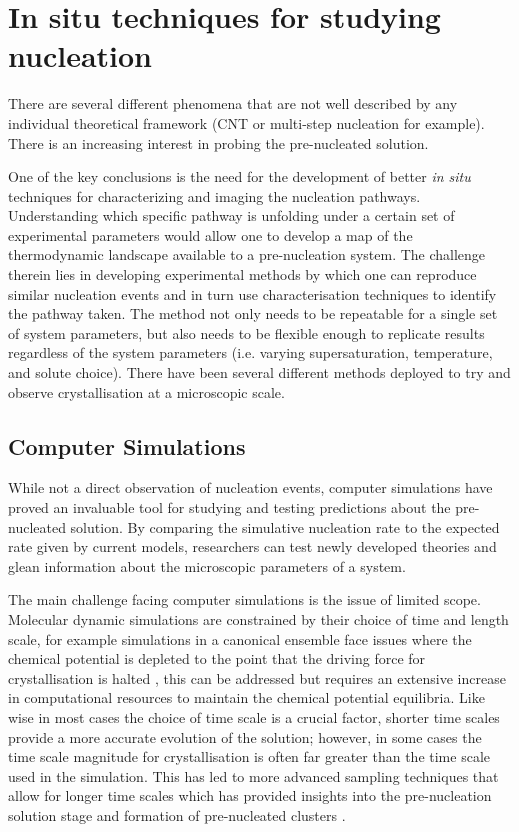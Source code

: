 \section{In situ techniques for studying nucleation}
There are several different phenomena \cite{Fu2021, Karthika2016} 
that are not well described by any individual theoretical framework 
(CNT or multi-step nucleation for example). There is an increasing 
interest in probing the pre-nucleated solution.

One of the key conclusions is the need for the development of 
better \textit{in situ} techniques for characterizing and 
imaging the nucleation pathways. Understanding which specific 
pathway is unfolding under a certain set of experimental 
parameters would allow one to develop a map of the thermodynamic 
landscape available to a pre-nucleation system. The challenge 
therein lies in developing experimental methods by which one can 
reproduce similar nucleation events and in turn use 
characterisation techniques to identify the pathway taken. The 
method not only needs to be repeatable for a single set of system 
parameters, but also needs to be flexible enough to replicate 
results regardless of the system parameters (i.e. varying 
supersaturation, temperature, and solute choice). There have 
been several different methods deployed to try and observe 
crystallisation at a microscopic scale.

\subsection{Computer Simulations}
While not a direct observation of nucleation events, computer
simulations have proved an invaluable tool for studying and 
testing predictions about the pre-nucleated solution. By 
comparing the simulative nucleation rate to the expected 
rate given by current models, researchers can test newly 
developed theories and glean information about the microscopic
parameters of a system. 

The main challenge facing computer simulations is the issue
of limited scope. Molecular dynamic simulations are constrained
by their choice of time and length scale, for example simulations
in a canonical ensemble face issues where the chemical potential
is depleted to the point that the driving force for crystallisation
is halted \cite{DuranOlivencia2015, Finney2023}, this can be 
addressed but requires an extensive increase in computational 
resources to maintain the chemical potential equilibria. Like wise
in most cases the choice of time scale is a crucial factor, shorter
time scales provide a more accurate evolution of the solution; 
however, in some cases the time scale magnitude for crystallisation
is often far greater than the time scale used in the simulation. This
has led to more advanced sampling techniques that allow for longer 
time scales which has provided insights into the pre-nucleation 
solution stage and formation of pre-nucleated clusters \cite{Finney2023}.
 
